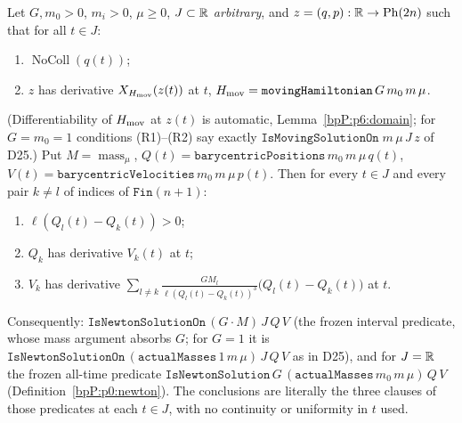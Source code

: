 \begin{proposition}\label{bpP:p6:reconstruction}
Let $G,m_0>0$, $m_i>0$, $\mu\ge0$, $J\subset\mathbb{R}$ \emph{arbitrary}, and $z=(q,p):\mathbb{R}\to\mathrm{Ph}(2n)$ such that for all $t\in J$:
\begin{enumerate}[label=(R\arabic*)]
\item $\operatorname{NoColl}(q(t))$;
\item $z$ has derivative $X_{H_{\rm mov}}(z(t))$ at $t$, $H_{\rm mov}=\texttt{movingHamiltonian}\,G\,m_0\,m\,\mu$.
\end{enumerate}
(Differentiability of $H_{\rm mov}$ at $z(t)$ is automatic, Lemma~\ref{bpP:p6:domain}; for $G=m_0=1$ conditions (R1)--(R2) say exactly $\texttt{IsMovingSolutionOn}\;m\,\mu\,J\,z$ of D25.) Put $M=\operatorname{mass}_\mu$, $Q(t)=\texttt{barycentricPositions}\,m_0\,m\,\mu\,q(t)$, $V(t)=\texttt{barycentricVelocities}\,m_0\,m\,\mu\,p(t)$. Then for every $t\in J$ and every pair $k\ne l$ of indices of $\texttt{Fin}(n+1)$:
\begin{enumerate}[label=(\alph*)]
\item $\ell(Q_l(t)-Q_k(t))>0$;
\item $Q_k$ has derivative $V_k(t)$ at $t$;
\item $V_k$ has derivative $\displaystyle\sum_{l\ne k}\frac{GM_l}{\ell(Q_l(t)-Q_k(t))^3}\bigl(Q_l(t)-Q_k(t)\bigr)$ at $t$.
\end{enumerate}
Consequently: $\texttt{IsNewtonSolutionOn}\,(G\cdot M)\,J\,Q\,V$ (the frozen interval predicate, whose mass argument absorbs $G$; for $G=1$ it is $\texttt{IsNewtonSolutionOn}\,(\texttt{actualMasses}\,1\,m\,\mu)\,J\,Q\,V$ as in D25), and for $J=\mathbb{R}$ the frozen all-time predicate $\texttt{IsNewtonSolution}\,G\,(\texttt{actualMasses}\,m_0\,m\,\mu)\,Q\,V$ (Definition~\ref{bpP:p0:newton}). The conclusions are literally the three clauses of those predicates at each $t\in J$, with no continuity or uniformity in $t$ used.
\end{proposition}

